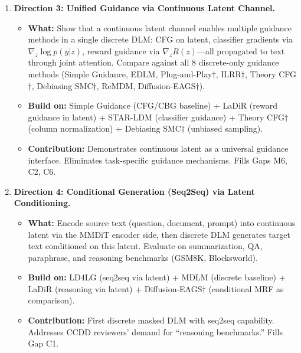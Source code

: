 \documentclass{article}
\begin{document}
\begin{enumerate}
    \item \textbf{Direction 3: Unified Guidance via Continuous Latent Channel.}
    \begin{itemize}[nosep]
        \item \textbf{What:} Show that a continuous latent channel enables multiple guidance methods in a single discrete DLM: CFG on latent, classifier gradients via $\nabla_z \log p(y|z)$, reward guidance via $\nabla_z R(z)$---all propagated to text through joint attention. Compare against all 8 discrete-only guidance methods (Simple Guidance, EDLM, Plug-and-Play$\dagger$, ILRR$\dagger$, Theory CFG$\dagger$, Debiasing SMC$\dagger$, ReMDM, Diffusion-EAGS$\dagger$).
        \item \textbf{Build on:} Simple Guidance (CFG/CBG baseline) + LaDiR (reward guidance in latent) + STAR-LDM (classifier guidance) + Theory CFG$\dagger$ (column normalization) + Debiasing SMC$\dagger$ (unbiased sampling).
        \item \textbf{Contribution:} Demonstrates continuous latent as a universal guidance interface. Eliminates task-specific guidance mechanisms. Fills Gaps M6, C2, C6.
    \end{itemize}

    \item \textbf{Direction 4: Conditional Generation (Seq2Seq) via Latent Conditioning.}
    \begin{itemize}[nosep]
        \item \textbf{What:} Encode source text (question, document, prompt) into continuous latent via the MMDiT encoder side, then discrete DLM generates target text conditioned on this latent. Evaluate on summarization, QA, paraphrase, and reasoning benchmarks (GSM8K, Blocksworld).
        \item \textbf{Build on:} LD4LG (seq2seq via latent) + MDLM (discrete baseline) + LaDiR (reasoning via latent) + Diffusion-EAGS$\dagger$ (conditional MRF as comparison).
        \item \textbf{Contribution:} First discrete masked DLM with seq2seq capability. Addresses CCDD reviewers' demand for ``reasoning benchmarks.'' Fills Gap C1.
    \end{itemize}


\end{enumerate}
\end{document}

